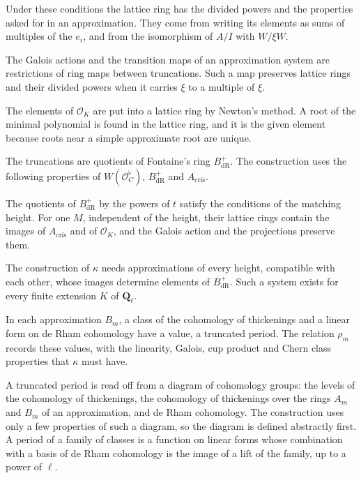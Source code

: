 Under these conditions the lattice ring has the divided powers and the properties asked for in an approximation. They
come from writing its elements as sums of multiples of the $e_i$, and from the isomorphism of $A/I$ with $W/\xi W$.

The Galois actions and the transition maps of an approximation system are restrictions of ring maps between
truncations. Such a map preserves lattice rings and their divided powers when it carries $\xi$ to a multiple of $\xi$.

The elements of $\mathcal O_K$ are put into a lattice ring by Newton's method. A root of the minimal polynomial is found
in the lattice ring, and it is the given element because roots near a simple approximate root are unique.

The truncations are quotients of Fontaine's ring $B_{\mathrm{dR}}^+$. The construction uses the following properties of
$W(\mathcal O_C^\flat)$, $B_{\mathrm{dR}}^+$ and $A_{\mathrm{cris}}$.

The quotients of $B_{\mathrm{dR}}^+$ by the powers of $t$ satisfy the conditions of the matching height. For one $M$,
independent of the height, their lattice rings contain the images of $A_{\mathrm{cris}}$ and of $\mathcal O_K$, and the
Galois action and the projections preserve them.

The construction of $\kappa$ needs approximations of every height, compatible with each other, whose images determine
elements of $B_{\mathrm{dR}}^+$. Such a system exists for every finite extension $K$ of $\mathbf Q_\ell$.

In each approximation $B_m$, a class of the cohomology of thickenings and a linear form on de Rham cohomology have a
value, a truncated period. The relation $\rho_m$ records these values, with the linearity, Galois, cup product and
Chern class properties that $\kappa$ must have.

A truncated period is read off from a diagram of cohomology groups: the levels of the cohomology of thickenings, the
cohomology of thickenings over the rings $A_m$ and $B_m$ of an approximation, and de Rham cohomology. The construction
uses only a few properties of such a diagram, so the diagram is defined abstractly first. A period of a family of classes
is a function on linear forms whose combination with a basis of de Rham cohomology is the image of a lift of the family,
up to a power of $\ell$.

